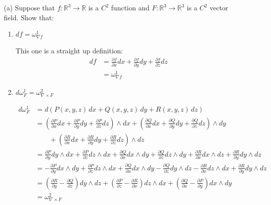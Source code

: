 \documentclass[11pt]{article}
\begin{document}
\begin{enumerate}
    \item[(a)] Suppose that \(f : \mathbb{R}^3 \to \mathbb{R}\) is a \(C^2\) function and \(F : \mathbb{R}^3 \to \mathbb{R}^3\) is a \(C^2\) vector field. Show that:
    \begin{enumerate}
        \item \(df = \omega^1_{\nabla f}\)
    \begin{solution}
        This one is a straight up definition:
        \begin{align*}
            df &= \frac{\partial f}{\partial x} dx + \frac{\partial f}{\partial y} dy + \frac{\partial f}{\partial z} dz \\
            &= \omega^1_{\nabla f}
        \end{align*}
    \end{solution}
        \item \(d\omega^1_F = \omega^2_{\nabla \times F}\)
        \begin{solution}
            
    \begin{align*}
        d\omega_F^1 &= d\left(P(x, y, z)\,dx + Q(x, y, z)\,dy + R(x, y, z)\,dz\right)\\
        &= \left(\frac{\partial P}{\partial x} dx + \frac{\partial P}{\partial y} dy + \frac{\partial P}{\partial z} dz\right)\wedge dx + \left(\frac{\partial Q}{\partial x} dx + \frac{\partial Q}{\partial y} dy + \frac{\partial Q}{\partial z} dz\right)\wedge dy\\
        &\qquad+ \left(\frac{\partial R}{\partial x} dx + \frac{\partial R}{\partial y} dy + \frac{\partial R}{\partial z} dz\right)\wedge dz\\
        &= \frac{\partial P}{\partial y} dy\wedge dx + \frac{\partial P}{\partial z} dz\wedge dx + \frac{\partial Q}{\partial x} dx \wedge dy+ \frac{\partial Q}{\partial z} dz\wedge dy + \frac{\partial R}{\partial x} dx\wedge dz + \frac{\partial R}{\partial y} dy \wedge dz\\
        &= -\frac{\partial P}{\partial y} dx\wedge dy + \frac{\partial P}{\partial z} dz\wedge dx + \frac{\partial Q}{\partial x} dx \wedge dy- \frac{\partial Q}{\partial z} dy\wedge dz - \frac{\partial R}{\partial x} dz\wedge dx + \frac{\partial R}{\partial y} dy \wedge dz\\\
        &= (\frac{\partial R}{\partial y} - \frac{\partial Q}{\partial z})dy \wedge dz + (\frac{\partial P}{\partial z} - \frac{\partial R}{\partial x})dz \wedge dx + (\frac{\partial Q}{\partial x} - \frac{\partial P}{\partial y})dx \wedge dy\\
        &= \omega_{\nabla \times F}^2
    \end{align*}
            \end{solution}


\end{enumerate}
\end{enumerate}
\end{document}
